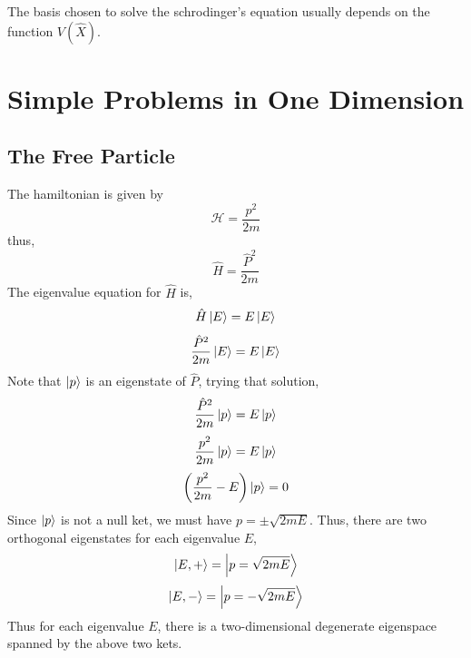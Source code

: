 \documentclass[12pt,a4paper]{report}
\newcommand{\hamiltonian}{\mathcal{H}}
\begin{document}
The basis chosen to solve the schrodinger's equation usually depends on the function $V(\hat{X})$.

\chapter{Simple Problems in One Dimension}

\section{The Free Particle}

The hamiltonian is given by
\begin{equation*}
    \hamiltonian = \frac{p^2}{2m}
\end{equation*}
thus,
\begin{equation*}
    \hat{H} = \frac{\hat{P}^2}{2m}
\end{equation*}
The eigenvalue equation for $\hat{H}$ is,
\begin{equation*}
    \hat{H}\ket{E} = E\ket{E}
\end{equation*}
\begin{equation*}
    \frac{\hat{P}^2}{2m}\ket{E} = E\ket{E}
\end{equation*}
Note that $\ket{p}$ is an eigenstate of $\hat{P}$, trying that solution,
\begin{equation*}
    \frac{\hat{P}^2}{2m}\ket{p} = E\ket{p}
\end{equation*}
\begin{equation*}
    \frac{p^2}{2m}\ket{p} = E\ket{p}
\end{equation*}
\begin{equation*}
    \left(\frac{p^2}{2m} - E\right)\ket{p} = 0
\end{equation*}
Since $\ket{p}$ is not a null ket, we must have $p = \pm \sqrt{2mE}$. Thus, there are two orthogonal
eigenstates for each eigenvalue $E$,
\begin{equation*}
    \ket{E, +} = \ket{p = \sqrt{2mE}}
\end{equation*}
\begin{equation*}
    \ket{E, -} = \ket{p = -\sqrt{2mE}}
\end{equation*}
Thus for each eigenvalue $E$, there is a two-dimensional degenerate eigenspace spanned by the above two kets.
\end{document}
